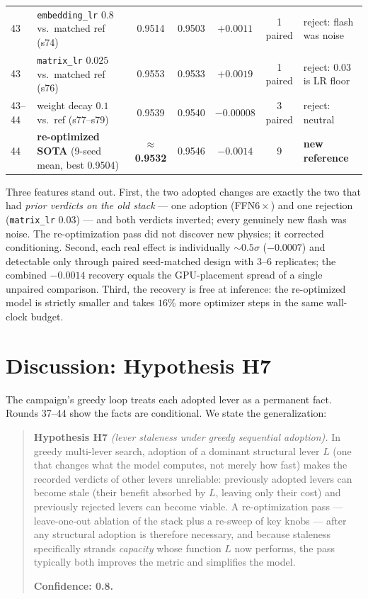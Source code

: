\documentclass{article}
\begin{document}
\begin{table}[t]
\begin{center}
\begin{scriptsize}
\begin{tabular}{llccccl}
43 & \texttt{embedding\_lr} $0.8$ vs.\ matched ref (s74) & 0.9514 & 0.9503 & $+0.0011$ & 1 paired & reject: flash was noise \\
43 & \texttt{matrix\_lr} $0.025$ vs.\ matched ref (s76) & 0.9553 & 0.9533 & $+0.0019$ & 1 paired & reject: $0.03$ is LR floor \\
43--44 & weight decay $0.1$ vs.\ ref (s77--s79) & 0.9539 & 0.9540 & $-0.00008$ & 3 paired & reject: neutral \\
\midrule
44 & \textbf{re-optimized SOTA} (9-seed mean, best 0.9504) & \textbf{$\approx$0.9532} & 0.9546 & $-0.0014$ & 9 & \textbf{new reference} \\
\bottomrule
\end{tabular}
\end{scriptsize}
\end{center}
\vskip -0.1in
\end{table}

Three features stand out. First, the two adopted changes are exactly the two that had \emph{prior verdicts on the old stack} --- one adoption (FFN$6\times$) and one rejection (\texttt{matrix\_lr} $0.03$) --- and both verdicts inverted; every genuinely new flash was noise. The re-optimization pass did not discover new physics; it corrected conditioning. Second, each real effect is individually $\sim 0.5\sigma$ ($-0.0007$) and detectable only through paired seed-matched design with 3--6 replicates; the combined $-0.0014$ recovery equals the GPU-placement spread of a single unpaired comparison. Third, the recovery is free at inference: the re-optimized model is strictly smaller and takes $16\%$ more optimizer steps in the same wall-clock budget.

\section{Discussion: Hypothesis H7}
\label{sec:discussion}

The campaign's greedy loop treats each adopted lever as a permanent fact. Rounds 37--44 show the facts are conditional. We state the generalization:

\begin{quote}
\textbf{Hypothesis H7} \emph{(lever staleness under greedy sequential adoption).} In greedy multi-lever search, adoption of a dominant structural lever $L$ (one that changes what the model computes, not merely how fast) makes the recorded verdicts of other levers unreliable: previously adopted levers can become stale (their benefit absorbed by $L$, leaving only their cost) and previously rejected levers can become viable. A re-optimization pass --- leave-one-out ablation of the stack plus a re-sweep of key knobs --- after any structural adoption is therefore necessary, and because staleness specifically strands \emph{capacity} whose function $L$ now performs, the pass typically both improves the metric and simplifies the model.

\textbf{Confidence: 0.8.}
\end{quote}
\end{document}
